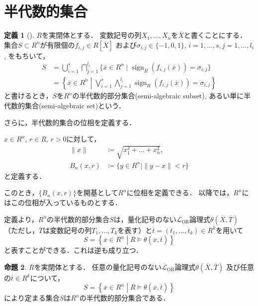 \documentclass[uplatex, dvipdfmx]{jsarticle}
\numberwithin{equation}{section}
\newcommand{\norm}[1]{\| {#1} \|}
\DeclareMathOperator{\sign}{sign}
\theoremstyle{definition}
\newtheorem{definition}{定義}[section]
\newtheorem{proposition}[definition]{命題}
\begin{document}
\section{半代数的集合}\label{section:5}
\begin{definition}[{\cite[Definition 2.1.4]{MR1659509}}]
     $R$を実閉体とする．
     変数記号の列$X_1, \dots, X_n$を$\overline{X}$と書くことにする．
     集合$S \subset R^n$が有限個の$f_{i,j} \in R\left[\overline{X}\right]$
     および$\sigma_{i,j} \in \{-1, 0 ,1\}$, $i=1, \dots, s, j = 1, \dots, l_i$, をもちいて，
     \begin{align}
          S &= \bigcup_{i=1}^s \bigcap_{j=1}^{l_i} \{\overline{x} \in R^n \mid \sign_R(f_{i,j}(\overline{x})) = \sigma_{i,j}\}\\
            &= \left\{ \overline{x} \in R^n \middle| \bigvee_{i=1}^s \bigwedge_{j=1}^{l_i} \sign_R(f_{i,j}(\overline{x})) = \sigma_{i,j} \right\}
     \end{align}
     と書けるとき，$S$を$R^n$の半代数的部分集合(semi-algebraic subset), あるい単に半代数的集合(semi-algebraic set)という．
\end{definition}

さらに，半代数的集合の位相を定義する．

$x \in R^n$, $r \in R$, $r>0$に対して，
\begin{align}
     \norm{x} &\coloneqq \sqrt{x_1^2 + \dots + x_n^2},\\
     B_n(x,r) &\coloneqq \{y \in R^n \mid \norm{y-x} < r\}
\end{align}
と定義する．

このとき，$\{B_n(x,r)\}$を開基として$R^n$に位相を定義できる．
以降では，$R^n$にはこの位相が入っているものとする．

定義より，$R^n$の半代数的部分集合$S$は，量化記号のない$\mathcal{L}_\mathrm{OR}$論理式$\theta\left( \overline{X}, \overline{T} \right)$ 
（ただし，$\overline{T}$は変数記号の列$T_1, \dots, T_k$を表す）と$\overline{t} = (t_1, \dots, t_k) \in R^k$を用いて
\begin{equation}
     S = \left\{ \overline{x} \in R^n \middle| R \models \theta(\overline{x}, \overline{t}) \right\}
\end{equation}
と表すことができる．これは逆も成り立つ．

\begin{proposition} \label{proposition:semi-algebraic-set}
     $R$を実閉体とする．
     任意の量化記号のない$\mathcal{L}_\mathrm{OR}$論理式$\theta\left( \overline{X}, \overline{T} \right)$
     及び任意の$\overline{t} \in R^k$について，
     \begin{equation}
          S = \left\{ \overline{x} \in R^n \middle| R \models \theta(\overline{x}, \overline{t}) \right\}
     \end{equation}
     により定まる集合$S$は$R^n$の半代数的部分集合である．
\end{proposition}
\end{document}

